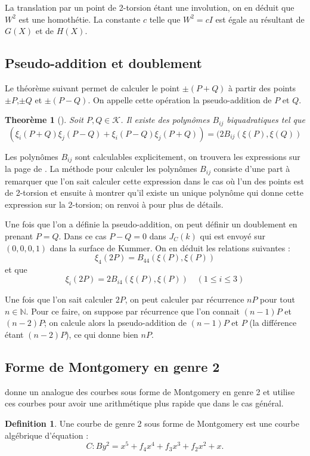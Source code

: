 \documentclass[a4paper]{article}
\newtheorem{theoreme}{Theorème}[section]
\theoremstyle{definition}
\newtheorem{definition}{Definition}[section]
\theoremstyle{remark}
\numberwithin{equation}{section}
\begin{document}
La translation par un point de 2-torsion étant une involution, on en déduit que $W^2$ est une homothétie. La constante $c$ telle que $W^2 = cI$ est égale au résultant de $G(X)$ et de $H(X)$.
\subsection{Pseudo-addition et doublement}
Le théorème suivant permet de calculer le point $\pm (P+Q)$ à partir des points $\pm P$,$\pm Q$ et $\pm(P-Q)$. On appelle cette opération la pseudo-addition de $P$ et $Q$.

\begin{theoreme}[\citet{cassels-Flynn}]
Soit $P,Q \in \mathcal{K}$. Il existe des polynômes $B_{ij}$ biquadratiques tel que
$$(\xi_i(P+Q)\xi_j(P-Q) + \xi_i(P-Q)\xi_j(P+Q)) = (2B_{ij}(\xi(P),\xi(Q))$$
\end{theoreme}

Les polynômes $B_{ij}$ sont calculables explicitement, on trouvera les expressions sur la page de \citet{biquad}. La méthode pour calculer les polynômes $B_{ij}$ consiste d'une part à remarquer que l'on sait calculer cette expression dans le cas où l'un des points est de 2-torsion et ensuite à montrer qu'il existe un unique polynôme qui donne cette expression sur la 2-torsion; on renvoi à \citet{cassels-Flynn} pour plus de détails.

Une fois que l'on a définie la pseudo-addition, on peut définir un doublement en prenant $P=Q$. Dans ce cas $P-Q = 0$ dans $J_C(k)$ qui est envoyé sur $(0,0,0,1)$ dans la surface de Kummer. On en déduit les relations suivantes :
$$\xi_4(2P) = B_{44}(\xi(P),\xi(P))$$
et que
$$\xi_i(2P) = 2B_{i4}(\xi(P),\xi(P)) \quad (1\leq i \leq 3)$$

Une fois que l'on sait calculer $2P$, on peut calculer par récurrence $nP$ pour tout $n\in\mathbb{N}$. Pour ce faire, on suppose par récurrence que l'on connait $(n-1)P$ et $(n-2)P$; on calcule alors la pseudo-addition de $(n-1)P$ et $P$ (la différence étant $(n-2)P$), ce qui donne bien $nP$.

\subsection{Forme de Montgomery en genre 2}
\citet{duquesne} donne un analogue des courbes sous forme de Montgomery en genre 2 et utilise ces courbes pour avoir une arithmétique plus rapide que dans le cas général.

\begin{definition}
Une courbe de genre 2 sous forme de Montgomery est une courbe algébrique d'équation :
$$C : By^2 = x^5 + f_4x^4 + f_3x^3 + f_2x^2 + x.$$
\end{definition}
\end{document}
